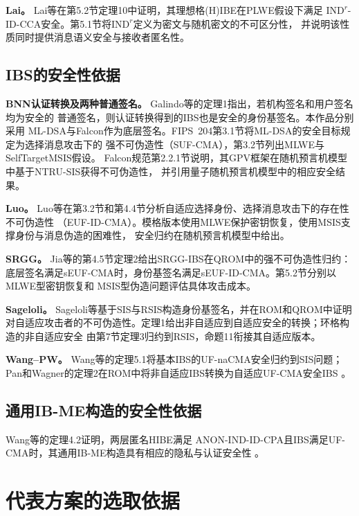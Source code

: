 \textbf{Lai。} Lai等在第5.2节定理10中证明，其理想格(H)IBE在PLWE假设下满足
$\mathrm{IND}^{r}$-ID-CCA安全。第5.1节将$\mathrm{IND}^{r}$定义为密文与随机密文的不可区分性，
并说明该性质同时提供消息语义安全与接收者匿名性\cite{lai2015trapdoors}。

\subsection{IBS的安全性依据}
\textbf{BNN认证转换及两种普通签名。} Galindo等的定理1指出，若机构签名和用户签名均为安全的
普通签名，则认证转换得到的IBS也是安全的身份基签名\cite{galindo2006ibs}。本作品分别采用
ML-DSA与Falcon作为底层签名。FIPS~204第3.1节将ML-DSA的安全目标规定为选择消息攻击下的
强不可伪造性（SUF-CMA），第3.2节列出MLWE与SelfTargetMSIS假设\cite{nist2024fips204}。
Falcon规范第2.2.1节说明，其GPV框架在随机预言机模型中基于NTRU-SIS获得不可伪造性，
并引用量子随机预言机模型中的相应安全结果\cite{falcon2020}。

\textbf{Luo。} Luo等在第3.2节和第4.4节分析自适应选择身份、选择消息攻击下的存在性不可伪造性
（EUF-ID-CMA）。模格版本使用MLWE保护密钥恢复，使用MSIS支撑身份与消息伪造的困难性，
安全归约在随机预言机模型中给出\cite{luo2024ibs}。

\textbf{SRGG。} Jia等的第4.5节定理2给出SRGG-IBS在QROM中的强不可伪造性归约：
底层签名满足sEUF-CMA时，身份基签名满足sEUF-ID-CMA。第5.2节分别以MLWE型密钥恢复和
MSIS型伪造问题评估具体攻击成本\cite{jia2025ibs}。

\textbf{Sageloli。} Sageloli等基于SIS与RSIS构造身份基签名，并在ROM和QROM中证明
对自适应攻击者的不可伪造性。定理1给出非自适应到自适应安全的转换；环格构造的非自适应安全
由第7节定理3归约到RSIS，命题11衔接其自适应版本\cite{sageloli2023ibs}。

\textbf{Wang--PW。} Wang等的定理5.1将基本IBS的UF-naCMA安全归约到SIS问题；
Pan和Wagner的定理2在ROM中将非自适应IBS转换为自适应UF-CMA安全IBS
\cite{wang2024ibme,pan2021ibs}。




\subsection{通用IB-ME构造的安全性依据}
Wang等的定理4.2证明，两层匿名HIBE满足
ANON-IND-ID-CPA且IBS满足UF-CMA时，其通用IB-ME构造具有相应的隐私与认证安全性
\cite{wang2024ibme}。

\section{代表方案的选取依据}

